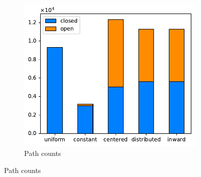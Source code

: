 \begin{figure}
\begin{subfigure}{\figwidth}
\label{printtime}
\end{subfigure}
\begin{subfigure}{\figwidth}\centering
\includegraphics[height=\figheight]{sources-validation-path-counts.pdf}
\caption{{Path counts}}
\label{pathcounts}
\end{subfigure}


\end{figure}
